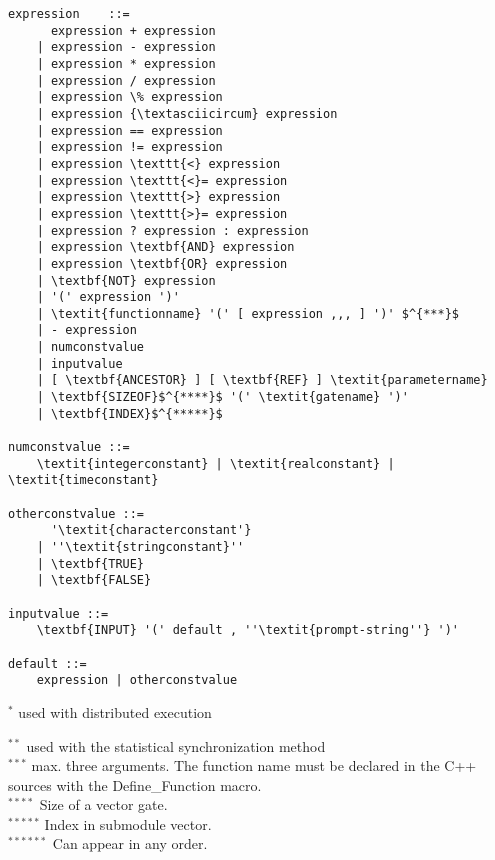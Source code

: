 \begin{Verbatim}[commandchars=\\\{\}]
expression    ::= 
      expression + expression
    | expression - expression
    | expression * expression
    | expression / expression
    | expression \% expression
    | expression {\textasciicircum} expression
    | expression == expression
    | expression != expression
    | expression \texttt{<} expression
    | expression \texttt{<}= expression
    | expression \texttt{>} expression
    | expression \texttt{>}= expression
    | expression ? expression : expression
    | expression \textbf{AND} expression
    | expression \textbf{OR} expression
    | \textbf{NOT} expression
    | '(' expression ')'
    | \textit{functionname} '(' [ expression ,,, ] ')' $^{***}$
    | - expression
    | numconstvalue
    | inputvalue
    | [ \textbf{ANCESTOR} ] [ \textbf{REF} ] \textit{parametername}
    | \textbf{SIZEOF}$^{****}$ '(' \textit{gatename} ')'
    | \textbf{INDEX}$^{*****}$

numconstvalue ::=
    \textit{integerconstant} | \textit{realconstant} | \textit{timeconstant}

otherconstvalue ::= 
      '\textit{characterconstant'}
    | ''\textit{stringconstant}''
    | \textbf{TRUE} 
    | \textbf{FALSE}

inputvalue ::= 
    \textbf{INPUT} '(' default , ''\textit{prompt-string''} ')'

default ::= 
    expression | otherconstvalue
\end{Verbatim}


$^{*}$ used with distributed execution


$^{**}$ used with the statistical synchronization method\\
$^{***}$ max. three arguments. The function name must be declared 
in the C++ sources with the Define\_Function macro.\\
$^{****}$ Size of a vector gate.\\
$^{*****}$ Index in submodule vector.\\
$^{******}$ Can appear in any order.



